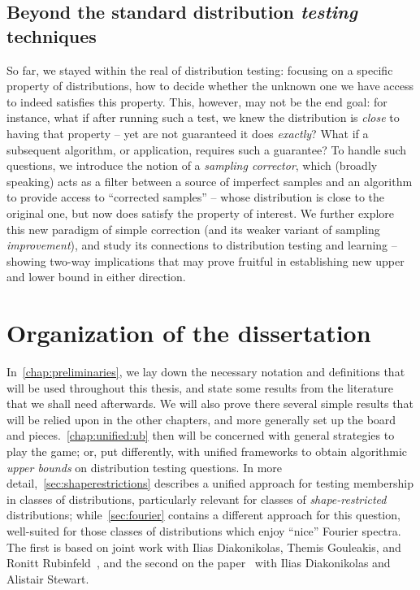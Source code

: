 \subsection*{Beyond the standard distribution \emph{testing} techniques} So far, we stayed within the real of distribution testing: focusing on a specific property of distributions, how to decide whether the unknown one we have access to indeed satisfies this property. This, however, may not be the end goal: for instance, what if after running such a test, we knew the distribution is \emph{close} to having that property -- yet are not guaranteed it does \emph{exactly}? What if a subsequent algorithm, or application, requires such a guarantee? To handle such questions, we introduce the notion of a \emph{sampling corrector}, which (broadly speaking) acts as a filter between a source of imperfect samples and an algorithm to provide access to ``corrected samples'' -- whose distribution is close to the original one, but now does satisfy the property of interest. We further explore this new paradigm of simple correction (and its weaker variant of sampling \emph{improvement}), and study its connections to distribution testing and learning -- showing two-way implications that may prove fruitful in establishing new upper and lower bound in either direction. 

\section*{Organization of the dissertation}

In~\cref{chap:preliminaries}, we lay down the necessary notation and definitions that will be used throughout this thesis, and state some results from the literature that we shall need afterwards. We will also prove there several simple results that will be relied upon in the other chapters, and more generally set up the board and pieces.~\cref{chap:unified:ub} then will be concerned with general strategies to play the game; or, put differently, with unified frameworks to obtain algorithmic \emph{upper bounds} on distribution testing questions. In more detail,~\cref{sec:shaperestrictions} describes a unified approach for testing membership in classes of distributions, particularly relevant for classes of \emph{shape-restricted} distributions; while~\cref{sec:fourier} contains a different approach for this question, well-suited for those classes of distributions which enjoy ``nice'' Fourier spectra. The first is based on joint work with Ilias Diakonikolas, Themis Gouleakis, and Ronitt Rubinfeld~\cite{CDGR:16}, and the second on the paper~\cite{CDS:17} with Ilias Diakonikolas and Alistair Stewart.

